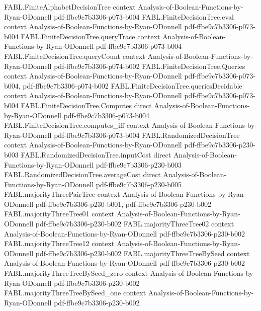 \begin{theorem}
\proofstep
  {FABL.FiniteAlphabetDecisionTree}
  {context}
  {Analysis-of-Boolean-Functions-by-Ryan-ODonnell}
  {pdf-ffbe9c7b3306-p073-b004}
\proofstep
  {FABL.FiniteDecisionTree.eval}
  {context}
  {Analysis-of-Boolean-Functions-by-Ryan-ODonnell}
  {pdf-ffbe9c7b3306-p073-b004}
\proofstep
  {FABL.FiniteDecisionTree.queryTrace}
  {context}
  {Analysis-of-Boolean-Functions-by-Ryan-ODonnell}
  {pdf-ffbe9c7b3306-p073-b004}
\proofstep
  {FABL.FiniteDecisionTree.queryCount}
  {context}
  {Analysis-of-Boolean-Functions-by-Ryan-ODonnell}
  {pdf-ffbe9c7b3306-p074-b002}
\proofstep
  {FABL.FiniteDecisionTree.Queries}
  {context}
  {Analysis-of-Boolean-Functions-by-Ryan-ODonnell}
  {pdf-ffbe9c7b3306-p073-b004,
    pdf-ffbe9c7b3306-p074-b002}
\proofstep
  {FABL.FiniteDecisionTree.queriesDecidable}
  {context}
  {Analysis-of-Boolean-Functions-by-Ryan-ODonnell}
  {pdf-ffbe9c7b3306-p073-b004}
\proofstep
  {FABL.FiniteDecisionTree.Computes}
  {direct}
  {Analysis-of-Boolean-Functions-by-Ryan-ODonnell}
  {pdf-ffbe9c7b3306-p073-b004}
\proofstep
  {FABL.FiniteDecisionTree.computes_iff}
  {context}
  {Analysis-of-Boolean-Functions-by-Ryan-ODonnell}
  {pdf-ffbe9c7b3306-p073-b004}
\proofstep
  {FABL.RandomizedDecisionTree}
  {context}
  {Analysis-of-Boolean-Functions-by-Ryan-ODonnell}
  {pdf-ffbe9c7b3306-p230-b003}
\proofstep
  {FABL.RandomizedDecisionTree.inputCost}
  {direct}
  {Analysis-of-Boolean-Functions-by-Ryan-ODonnell}
  {pdf-ffbe9c7b3306-p230-b003}
\proofstep
  {FABL.RandomizedDecisionTree.averageCost}
  {direct}
  {Analysis-of-Boolean-Functions-by-Ryan-ODonnell}
  {pdf-ffbe9c7b3306-p230-b005}
\proofstep
  {FABL.majorityThreePairTree}
  {context}
  {Analysis-of-Boolean-Functions-by-Ryan-ODonnell}
  {pdf-ffbe9c7b3306-p230-b001,
    pdf-ffbe9c7b3306-p230-b002}
\proofstep
  {FABL.majorityThreeTree01}
  {context}
  {Analysis-of-Boolean-Functions-by-Ryan-ODonnell}
  {pdf-ffbe9c7b3306-p230-b002}
\proofstep
  {FABL.majorityThreeTree02}
  {context}
  {Analysis-of-Boolean-Functions-by-Ryan-ODonnell}
  {pdf-ffbe9c7b3306-p230-b002}
\proofstep
  {FABL.majorityThreeTree12}
  {context}
  {Analysis-of-Boolean-Functions-by-Ryan-ODonnell}
  {pdf-ffbe9c7b3306-p230-b002}
\proofstep
  {FABL.majorityThreeTreeBySeed}
  {context}
  {Analysis-of-Boolean-Functions-by-Ryan-ODonnell}
  {pdf-ffbe9c7b3306-p230-b002}
\proofstep
  {FABL.majorityThreeTreeBySeed_zero}
  {context}
  {Analysis-of-Boolean-Functions-by-Ryan-ODonnell}
  {pdf-ffbe9c7b3306-p230-b002}
\proofstep
  {FABL.majorityThreeTreeBySeed_one}
  {context}
  {Analysis-of-Boolean-Functions-by-Ryan-ODonnell}
  {pdf-ffbe9c7b3306-p230-b002}

\end{theorem}
